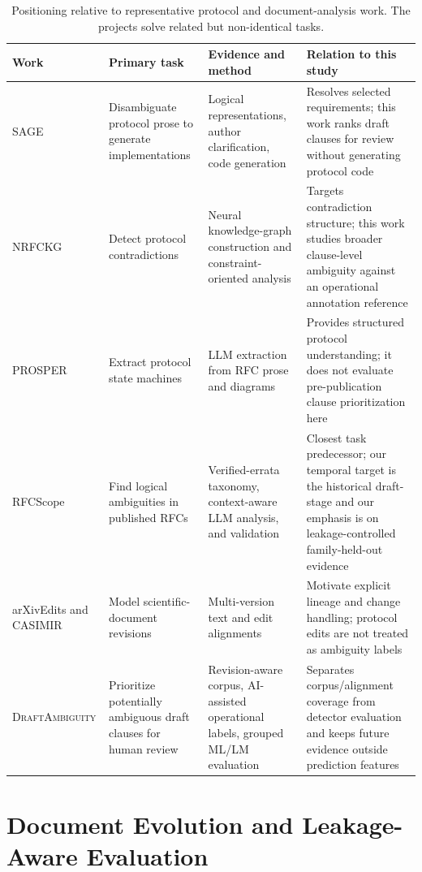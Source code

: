 \documentclass[12pt,a4paper,oneside]{report}
\newcommand{\system}{\textsc{DraftAmbiguity}}
\begin{document}
\begin{table}[!tbp]
\caption{Positioning relative to representative protocol and document-analysis work. The projects solve related but non-identical tasks.}
\label{tab:related-work}
\centering
\footnotesize
\setlength{\tabcolsep}{3pt}
\begin{tabularx}{\textwidth}{>{\raggedright\arraybackslash}p{}>{\raggedright\arraybackslash}p{}>{\raggedright\arraybackslash}p{}Y}
\toprule
Work & Primary task & Evidence and method & Relation to this study \\
\midrule
SAGE~\cite{yen2021sage} & Disambiguate protocol prose to generate implementations & Logical representations, author clarification, code generation & Resolves selected requirements; this work ranks draft clauses for review without generating protocol code \\
NRFCKG~\cite{feng2023nrfckg} & Detect protocol contradictions & Neural knowledge-graph construction and constraint-oriented analysis & Targets contradiction structure; this work studies broader clause-level ambiguity against an operational annotation reference \\
PROSPER~\cite{sharma2024prosper} & Extract protocol state machines & LLM extraction from RFC prose and diagrams & Provides structured protocol understanding; it does not evaluate pre-publication clause prioritization here \\
RFCScope~\cite{pawagi2025rfcscope} & Find logical ambiguities in published RFCs & Verified-errata taxonomy, context-aware LLM analysis, and validation & Closest task predecessor; our temporal target is the historical draft-stage and our emphasis is on leakage-controlled family-held-out evidence \\
arXivEdits and CASIMIR~\cite{jiang2022arxivedits,tinnes2024casimir} & Model scientific-document revisions & Multi-version text and edit alignments & Motivate explicit lineage and change handling; protocol edits are not treated as ambiguity labels \\
\system{} & Prioritize potentially ambiguous draft clauses for human review & Revision-aware corpus, AI-assisted operational labels, grouped ML/LM evaluation & Separates corpus/alignment coverage from detector evaluation and keeps future evidence outside prediction features \\
\bottomrule
\end{tabularx}
\end{table}

\section{Document Evolution and Leakage-Aware Evaluation}
\end{document}
